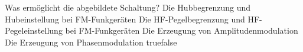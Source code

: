     {Was ermöglicht die abgebildete Schaltung?}
    {Die Hubbegrenzung und Hubeinstellung bei FM-Funkgeräten}
    {Die HF-Pegelbegrenzung und HF-Pegeleinstellung bei FM-Funkgeräten}
    {Die Erzeugung von Amplitudenmodulation}
    {Die Erzeugung von Phasenmodulation}
    {true}{false}